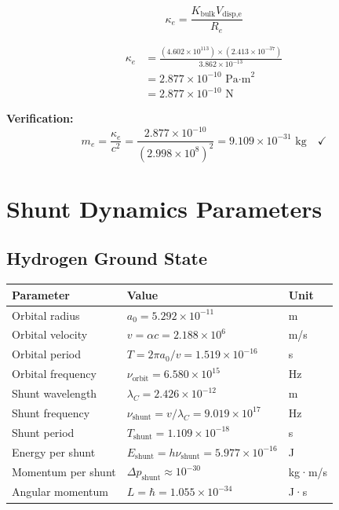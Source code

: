 \documentclass{article}
\begin{document}
\begin{equation}
\kappa_e = \frac{K_{\text{bulk}} V_{\text{disp,e}}}{R_e}
\end{equation}

\begin{align}
\kappa_e &= \frac{(4.602 \times 10^{113}) \times (2.413 \times 10^{-37})}{3.862 \times 10^{-13}} \\
&= 2.877 \times 10^{-10} \text{ Pa·m}^2 \\
&= 2.877 \times 10^{-10} \text{ N}
\end{align}

\textbf{Verification:}
\begin{equation}
m_e = \frac{\kappa_e}{c^2} = \frac{2.877 \times 10^{-10}}{(2.998 \times 10^8)^2} = 9.109 \times 10^{-31} \text{ kg} \quad \checkmark
\end{equation}

\section{Shunt Dynamics Parameters}

\subsection{Hydrogen Ground State}

\begin{longtable}{lll}
\toprule
\textbf{Parameter} & \textbf{Value} & \textbf{Unit} \\
\midrule
Orbital radius & $a_0 = 5.292 \times 10^{-11}$ & m \\
Orbital velocity & $v = \alpha c = 2.188 \times 10^6$ & m/s \\
Orbital period & $T = 2\pi a_0 / v = 1.519 \times 10^{-16}$ & s \\
Orbital frequency & $\nu_{\text{orbit}} = 6.580 \times 10^{15}$ & Hz \\
Shunt wavelength & $\lambda_C = 2.426 \times 10^{-12}$ & m \\
Shunt frequency & $\nu_{\text{shunt}} = v/\lambda_C = 9.019 \times 10^{17}$ & Hz \\
Shunt period & $T_{\text{shunt}} = 1.109 \times 10^{-18}$ & s \\
Energy per shunt & $E_{\text{shunt}} = h \nu_{\text{shunt}} = 5.977 \times 10^{-16}$ & J \\
Momentum per shunt & $\Delta p_{\text{shunt}} \approx 10^{-30}$ & kg·m/s \\
Angular momentum & $L = \hbar = 1.055 \times 10^{-34}$ & J·s \\
\bottomrule
\end{longtable}
\end{document}
